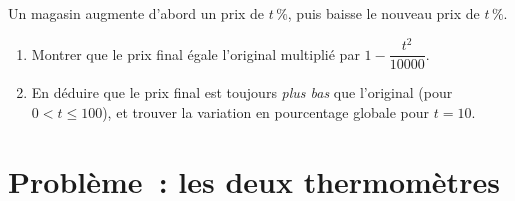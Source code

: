 \begin{exercise}[$\star\star\star$]\label{exo:g9:linfunc:10}
Un magasin augmente d'abord un prix de $t\,\%$, puis baisse le nouveau
prix de $t\,\%$.
\begin{enumerate}
  \item Montrer que le prix final égale l'original multiplié par
        $1 - \dfrac{t^2}{10000}$.
  \item En déduire que le prix final est toujours \emph{plus bas} que
        l'original (pour $0 < t \leq 100$), et trouver la variation en
        pourcentage globale pour $t = 10$.
\end{enumerate}
\end{exercise}

\section{Problème~: les deux thermomètres}

